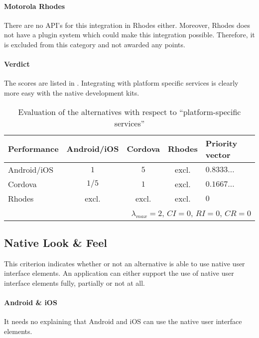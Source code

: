 \paragraph{Motorola Rhodes} There are no API's for this integration in Rhodes either. Moreover, Rhodes does not have a plugin system which could make this integration possible. Therefore, it is excluded from this category and not awarded any points.

\paragraph{Verdict} The scores are listed in . Integrating with platform specific services is clearly more easy with the native development kits.

\begin{table}[h!]
    \begin{center}
        \begin{tabular}{lcccl}
            \hline
            \textbf{Performance} & Android/iOS & Cordova & Rhodes & Priority vector \\
            \hline
            Android/iOS          & $1$         & $5$     & excl. & $0.8333\ldots$        \\
            Cordova              & $1/5$       & $1$     & excl. & $0.1667\ldots$        \\
            Rhodes               & excl.       & excl.   & excl. & $0$        \\
            \hline
            \multicolumn{5}{r}{$\lambda_{max} = 2$, $CI = 0$, $RI = 0$, $CR = 0$}\\
            \hline
        \end{tabular}
        \caption{Evaluation of the alternatives with respect to ``platform-specific services''}
        \label{tab:pss}
    \end{center}
\end{table}

\subsection{Native Look \& Feel}

This criterion indicates whether or not an alternative is able to use native user interface elements. An application can either support the use of native user interface elements fully, partially or not at all.

\paragraph{Android \& iOS} It needs no explaining that Android and iOS can use the native user interface elements.

